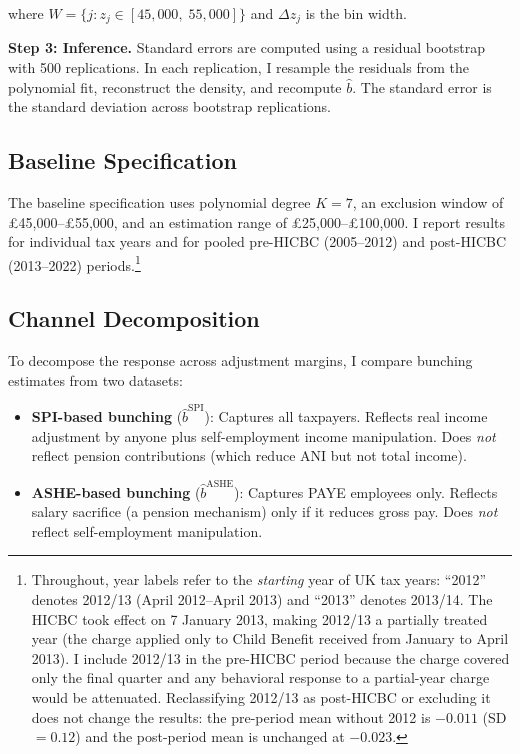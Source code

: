 \documentclass[12pt]{article}
\newcommand{\bhat}{\hat{b}}
\begin{document}
\noindent where $W = \{j : z_j \in [45{,}000, \; 55{,}000]\}$ and $\Delta z_j$ is the bin width.

\textbf{Step 3: Inference.} Standard errors are computed using a residual bootstrap with 500 replications. In each replication, I resample the residuals from the polynomial fit, reconstruct the density, and recompute $\bhat$. The standard error is the standard deviation across bootstrap replications.

\subsection{Baseline Specification}

The baseline specification uses polynomial degree $K = 7$, an exclusion window of \pounds45,000--\pounds55,000, and an estimation range of \pounds25,000--\pounds100,000. I report results for individual tax years and for pooled pre-HICBC (2005--2012) and post-HICBC (2013--2022) periods.\footnote{Throughout, year labels refer to the \emph{starting} year of UK tax years: ``2012'' denotes 2012/13 (April 2012--April 2013) and ``2013'' denotes 2013/14. The HICBC took effect on 7 January 2013, making 2012/13 a partially treated year (the charge applied only to Child Benefit received from January to April 2013). I include 2012/13 in the pre-HICBC period because the charge covered only the final quarter and any behavioral response to a partial-year charge would be attenuated. Reclassifying 2012/13 as post-HICBC or excluding it does not change the results: the pre-period mean without 2012 is $-0.011$ (SD $= 0.12$) and the post-period mean is unchanged at $-0.023$.}

\subsection{Channel Decomposition}

To decompose the response across adjustment margins, I compare bunching estimates from two datasets:

\begin{itemize}
    \item \textbf{SPI-based bunching} ($\bhat^{\text{SPI}}$): Captures all taxpayers. Reflects real income adjustment by anyone plus self-employment income manipulation. Does \emph{not} reflect pension contributions (which reduce ANI but not total income).
    \item \textbf{ASHE-based bunching} ($\bhat^{\text{ASHE}}$): Captures PAYE employees only. Reflects salary sacrifice (a pension mechanism) only if it reduces gross pay. Does \emph{not} reflect self-employment manipulation.
\end{itemize}
\end{document}

